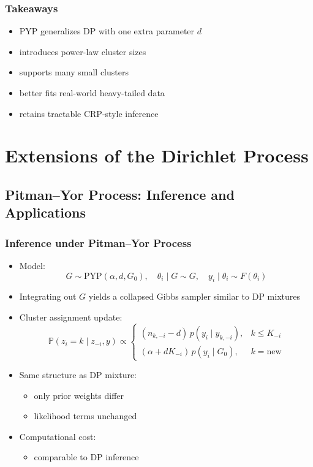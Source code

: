 \documentclass[12pt,oneside]{book}
\numberwithin{equation}{section}
\theoremstyle{definition}
\theoremstyle{plain}
\theoremstyle{remark}
\begin{document}
\subsection*{Takeaways}

\begin{itemize}
\item PYP generalizes DP with one extra parameter $d$
\item introduces power-law cluster sizes
\item supports many small clusters
\item better fits real-world heavy-tailed data
\item retains tractable CRP-style inference
\end{itemize}

\chapter{Extensions of the Dirichlet Process}

\section{Pitman--Yor Process: Inference and Applications}

\subsection{Inference under Pitman--Yor Process}

\begin{itemize}
\item Model:
\[
G \sim \text{PYP}(\alpha, d, G_0), \quad \theta_i \mid G \sim G, \quad y_i \mid \theta_i \sim F(\theta_i)
\]

\item Integrating out $G$ yields a collapsed Gibbs sampler similar to DP mixtures

\item Cluster assignment update:
\[
\mathbb{P}(z_i = k \mid z_{-i}, y) \propto
\begin{cases}
(n_{k,-i} - d)\, p(y_i \mid y_{k,-i}), & k \le K_{-i} \\
(\alpha + d K_{-i})\, p(y_i \mid G_0), & k = \text{new}
\end{cases}
\]

\item Same structure as DP mixture:
\begin{itemize}
\item only prior weights differ
\item likelihood terms unchanged
\end{itemize}

\item Computational cost:
\begin{itemize}
\item comparable to DP inference
\end{itemize}
\end{itemize}
\end{document}
